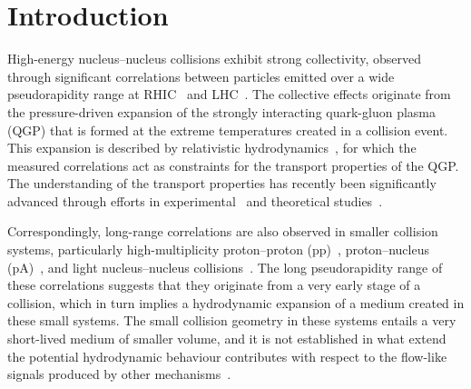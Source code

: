 
\section{Introduction}
\label{sec:intro}

High-energy nucleus--nucleus collisions exhibit strong collectivity, observed through significant correlations between particles emitted over a wide pseudorapidity range at RHIC~\cite{Adams:2005dq,Adcox:2004mh,Arsene:2004fa,Back:2004je} and LHC~\cite{Abelev:2012di, Abelev:2014pua, ATLAS:2011ah}. The collective effects originate from the pressure-driven expansion of the strongly interacting quark-gluon plasma (QGP) that is formed at the extreme temperatures created in a collision event. This expansion is described by relativistic hydrodynamics~\cite{Romatschke:2007mq,Jeon:2015dfa,Romatschke:2017ejr}, for which the measured correlations act as constraints for the transport properties of the QGP. The understanding of the transport properties has recently been significantly advanced through efforts in experimental~\cite{ALICE:2016kpq,Acharya:2017gsw,Acharya:2017zfg,Acharya:2020taj,ALICE:2021klf,ALICE:2021adw} and theoretical studies~\cite{Niemi:2015qia,Bernhard:2016tnd,Bernhard:2019bmu,Parkkila:2021tqq,Parkkila:2021yha}.

Correspondingly, long-range correlations are also observed in smaller collision systems, particularly high-multiplicity proton--proton (pp)~\cite{Aad:2015gqa,Khachatryan:2015lva,Khachatryan:2016txc,Acharya:2019vdf}, proton--nucleus (pA)~\cite{ALICE:2012eyl,Aad:2014lta,Aaboud:2016yar,Khachatryan:2016ibd}, and light nucleus--nucleus collisions~\cite{PHENIX:2018lia,Aidala:2017ajz}. The long pseudorapidity range of these correlations suggests that they originate from a very early stage of a collision, which in turn implies a hydrodynamic expansion of a medium created in these small systems. The small collision geometry in these systems entails a very short-lived medium of smaller volume, and it is not established in what extend the potential hydrodynamic behaviour contributes with respect to the flow-like signals produced by other mechanisms~\cite{Busza:2018rrf,Nagle:2018nvi}.

